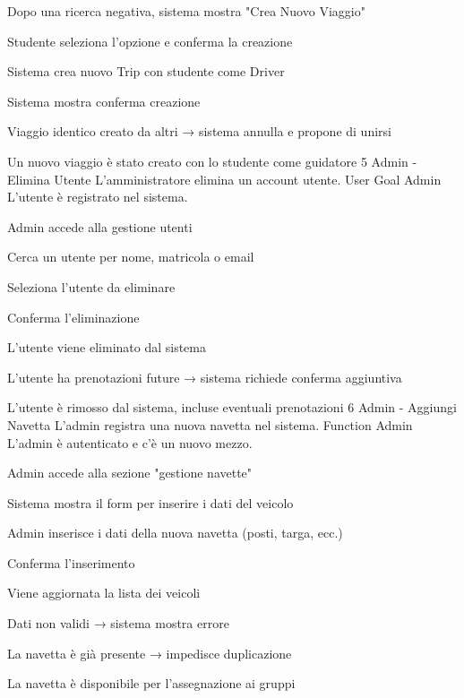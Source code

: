 {\begin{description}[nosep]
    \item[1.] Dopo una ricerca negativa, sistema mostra "Crea Nuovo Viaggio"
    \item[2.] Studente seleziona l'opzione e conferma la creazione
    \item[3.] Sistema crea nuovo Trip con studente come Driver
    \item[4.] Sistema mostra conferma creazione
\end{description}}
{\begin{description}[nosep]
    \item[3a.] Viaggio identico creato da altri → sistema annulla e propone di unirsi
\end{description}}
{Un nuovo viaggio è stato creato con lo studente come guidatore}
\label{uc:uc4}
\UseCase
{5}
{Admin - Elimina Utente}
{L’amministratore elimina un account utente.}
{User Goal}
{Admin}
{L’utente è registrato nel sistema.}
{\begin{description}[nosep]
    \item[1.] Admin accede alla gestione utenti
    \item[2.] Cerca un utente per nome, matricola o email
    \item[3.] Seleziona l’utente da eliminare
    \item[4.] Conferma l’eliminazione
    \item[5.] L'utente viene eliminato dal sistema
\end{description}}
{\begin{description}[nosep]
    \item[3a.] L’utente ha prenotazioni future → sistema richiede conferma aggiuntiva
\end{description}}
{L’utente è rimosso dal sistema, incluse eventuali prenotazioni}
\label{uc:uc5}
\UseCase
{6}
{Admin - Aggiungi Navetta}
{L’admin registra una nuova navetta nel sistema.}
{Function}
{Admin}
{L’admin è autenticato e c'è un nuovo mezzo.}
{\begin{description}[nosep]
    \item[1.] Admin accede alla sezione "gestione navette"
    \item[2.] Sistema mostra il form per inserire i dati del veicolo
    \item[3.] Admin inserisce i dati della nuova navetta (posti, targa, ecc.)
    \item[4.] Conferma l’inserimento
    \item[5.] Viene aggiornata la lista dei veicoli
\end{description}}
{\begin{description}[nosep]
    \item[2a.] Dati non validi → sistema mostra errore
    \item[3a.] La navetta è già presente → impedisce duplicazione
\end{description}}
{La navetta è disponibile per l’assegnazione ai gruppi}
\label{uc:uc6}
